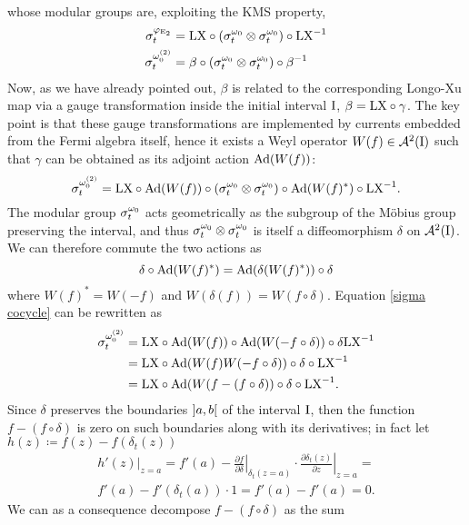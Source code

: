  whose modular groups are, exploiting the \ac{KMS} property,
 \begin{align*}
 \sigma_t^{\varphi_{\textrm{E}_2}}&=\textrm{LX}\circ
 \left(\sigma_t^{\omega_0}\otimes\sigma_t^{\omega_0}\right)\circ\textrm{LX}^{-1}\\
 \sigma_t^{\omega_0^{(2)}}&=\beta
 \circ\left(\sigma_t^{\omega_0}\otimes\sigma_t^{\omega_0}\right)
 \circ\beta^{-1}
 \end{align*}
 Now, as we have already pointed out, $\beta$ is related to
 the corresponding Longo-Xu map via a gauge transformation
 inside the initial interval $\textrm{I}$, $\beta=\textrm{LX}\circ\gamma$.
 The key point is that these gauge transformations are
 implemented by currents embedded from the Fermi algebra
 itself, hence it exists a Weyl operator $W(f)\in\mathcal{A}^2
 (\textrm{I})$ such that $\gamma$ can be obtained as its adjoint action
 $\operatorname{Ad}(W(f))$:
 \begin{equation}
 \label{sigma cocycle}
 \sigma_t^{\omega_0^{(2)}}=\textrm{LX}\circ\operatorname{Ad}(W(f))\circ
 \left(\sigma_t^{\omega_0}\otimes\sigma_t^{\omega_0}\right)
 \circ \operatorname{Ad}(W(f)^*)\circ\textrm{LX}^{-1}.
 \end{equation}
 The modular group $\sigma_t^{\omega_0}$ acts geometrically
 as the subgroup of the M\"obius group preserving
 the interval, and thus $\sigma_t^{\omega_0}\otimes\sigma_t^{\omega_0}$
 is itself a diffeomorphism $\delta$ on $\mathcal{A}^2(\textrm{I})$.
 We can therefore commute the two actions as
 \[
 \delta\circ\operatorname{Ad}(W(f)^*)=\operatorname{Ad}(\delta(W(f)^*))\circ\delta
 \]
 where $W(f)^*=W(-f)$ and $W(\delta(f))=W(f\circ\delta)$.
 Equation \eqref{sigma cocycle} can be rewritten as
 \begin{align*}
 \sigma_t^{\omega_0^{(2)}}&=\textrm{LX}\circ\operatorname{Ad}(W(f))\circ
 \operatorname{Ad}(W(-f\circ\delta))\circ\delta\textrm{LX}^{-1}\\
 &=\textrm{LX}\circ\operatorname{Ad}(W(f)W(-f\circ\delta))\circ\delta\circ\textrm{LX}^{-1}\\
 &=\textrm{LX}\circ\operatorname{Ad}(W(f-(f\circ\delta))\circ\delta\circ\textrm{LX}^{-1}.
 \end{align*}
 Since $\delta$ preserves the boundaries 
 $\mathopen{]}a,b\mathclose{[}$ of the interval $\textrm{I}$, then
 the function $f-(f\circ\delta)$ is zero on such boundaries along
 with its derivatives; in fact let $h(z)\coloneqq f(z)
 -f(\delta_t(z))$
 \begin{multline*}
 h'(z)|_{z=a}=f'(a)
 -{\left.\frac{\partial f}{\partial \delta}\right|}_{\delta_t(z=a)}
 \cdot{\left.\frac{\partial \delta_t(z)}{\partial z}\right|}_{z=a}=\\
 f'(a)-f'(\delta_t(a))\cdot 1=f'(a)-f'(a)=0.
 \end{multline*}
 We can as a consequence decompose $f-(f\circ\delta)$ as the sum

